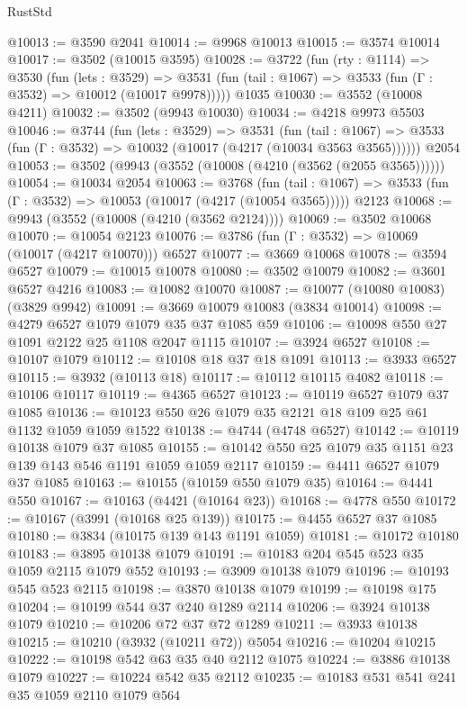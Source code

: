\begin{lexlean}{RustStd}
\begin{coremodule}
@10013 := @3590 @2041
@10014 := @9968 @10013
@10015 := @3574 @10014
@10017 := @3502 (@10015 @3595)
@10028 := @3722
    (fun (rty : @1114) =>
    @3530
      (fun (lets : @3529) =>
      @3531 (fun (tail : @1067) => @3533 (fun (Γ : @3532) => @10012 (@10017 @9978)))))
    @1035
@10030 := @3552 (@10008 @4211)
@10032 := @3502 (@9943 @10030)
@10034 := @4218 @9973 @5503
@10046 := @3744
    (fun (lets : @3529) =>
    @3531
      (fun (tail : @1067) =>
      @3533 (fun (Γ : @3532) => @10032 (@10017 (@4217 (@10034 @3563 @3565))))))
    @2054
@10053 := @3502 (@9943 (@3552 (@10008 (@4210 (@3562 (@2055 @3565))))))
@10054 := @10034 @2054
@10063 := @3768
    (fun (tail : @1067) => @3533 (fun (Γ : @3532) => @10053 (@10017 (@4217 (@10054 @3565)))))
    @2123
@10068 := @9943 (@3552 (@10008 (@4210 (@3562 @2124))))
@10069 := @3502 @10068
@10070 := @10054 @2123
@10076 := @3786 (fun (Γ : @3532) => @10069 (@10017 (@4217 @10070))) @6527
@10077 := @3669 @10068
@10078 := @3594 @6527
@10079 := @10015 @10078
@10080 := @3502 @10079
@10082 := @3601 @6527 @4216
@10083 := @10082 @10070
@10087 := @10077 (@10080 @10083) (@3829 @9942)
@10091 := @3669 @10079 @10083 (@3834 @10014)
@10098 := @4279 @6527 @1079 @1079 @35 @37 @1085 @59
@10106 := @10098 @550 @27 @1091 @2122 @25 @1108 @2047 @1115
@10107 := @3924 @6527
@10108 := @10107 @1079
@10112 := @10108 @18 @37 @18 @1091
@10113 := @3933 @6527
@10115 := @3932 (@10113 @18)
@10117 := @10112 @10115 @4082
@10118 := @10106 @10117
@10119 := @4365 @6527
@10123 := @10119 @6527 @1079 @37 @1085
@10136 := @10123 @550 @26 @1079 @35 @2121 @18 @109 @25 @61 @1132 @1059 @1059 @1522
@10138 := @4744 (@4748 @6527)
@10142 := @10119 @10138 @1079 @37 @1085
@10155 := @10142 @550 @25 @1079 @35 @1151 @23 @139 @143 @546 @1191 @1059 @1059 @2117
@10159 := @4411 @6527 @1079 @37 @1085
@10163 := @10155 (@10159 @550 @1079 @35)
@10164 := @4441 @550
@10167 := @10163 (@4421 (@10164 @23))
@10168 := @4778 @550
@10172 := @10167 (@3991 (@10168 @25 @139))
@10175 := @4455 @6527 @37 @1085
@10180 := @3834 (@10175 @139 @143 @1191 @1059)
@10181 := @10172 @10180
@10183 := @3895 @10138 @1079
@10191 := @10183 @204 @545 @523 @35 @1059 @2115 @1079 @552
@10193 := @3909 @10138 @1079
@10196 := @10193 @545 @523 @2115
@10198 := @3870 @10138 @1079
@10199 := @10198 @175
@10204 := @10199 @544 @37 @240 @1289 @2114
@10206 := @3924 @10138 @1079
@10210 := @10206 @72 @37 @72 @1289
@10211 := @3933 @10138
@10215 := @10210 (@3932 (@10211 @72)) @5054
@10216 := @10204 @10215
@10222 := @10198 @542 @63 @35 @40 @2112 @1075
@10224 := @3886 @10138 @1079
@10227 := @10224 @542 @35 @2112
@10235 := @10183 @531 @541 @241 @35 @1059 @2110 @1079 @564

\end{coremodule}
\end{lexlean}
